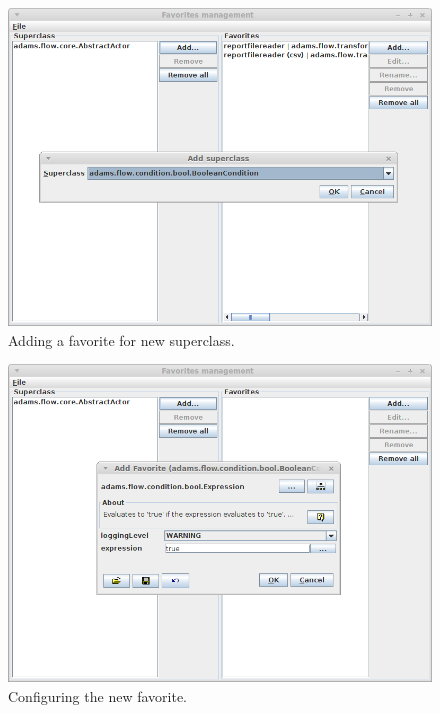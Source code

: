 \begin{figure}[htb]
  \centering
  \includegraphics[width=12.0cm]{images/favoritesmanagement-addsuper1.png}
  \caption{Adding a favorite for new superclass.}
  \label{favoritesmanagement-addsuper1}
\end{figure}

\begin{figure}[htb]
  \centering
  \includegraphics[width=12.0cm]{images/favoritesmanagement-addsuper2.png}
  \caption{Configuring the new favorite.}
  \label{favoritesmanagement-addsuper2}
\end{figure}

